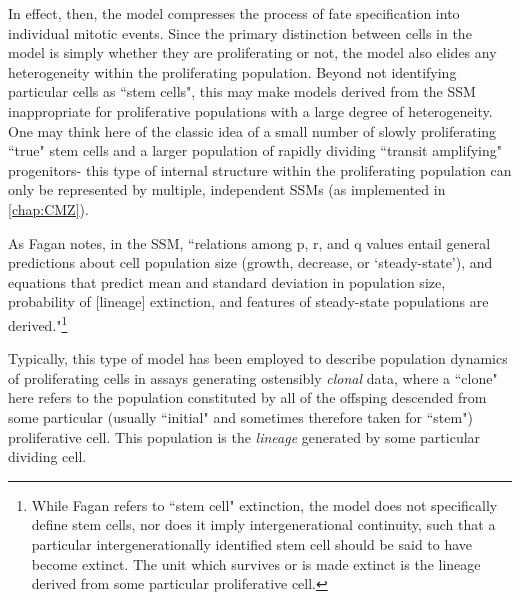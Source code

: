 In effect, then, the model compresses the process of fate specification into individual mitotic events. Since the primary distinction between cells in the model is simply whether they are proliferating or not, the model also elides any heterogeneity within the proliferating population. Beyond not identifying particular cells as ``stem cells", this may make models derived from the SSM inappropriate for proliferative populations with a large degree of heterogeneity. One may think here of the classic idea of a small number of slowly proliferating ``true" stem cells and a larger population of rapidly dividing ``transit amplifying" progenitors- this type of internal structure within the proliferating population can only be represented by multiple, independent SSMs (as implemented in \autoref{chap:CMZ}).

As Fagan notes, in the SSM, ``relations among p, r, and q values entail general predictions about cell population size (growth, decrease, or ‘steady-state’), and equations that predict mean and standard deviation in population size, probability of [lineage] extinction, and features of steady-state populations are derived."\footnote{While Fagan refers to ``stem cell" extinction, the model does not specifically define stem cells, nor does it imply intergenerational continuity, such that a particular intergenerationally identified stem cell should be said to have become extinct. The unit which survives or is made extinct is the lineage derived from some particular proliferative cell.}\cite[p.60]{Fagan2013}

Typically, this type of model has been employed to describe population dynamics of proliferating cells in assays generating ostensibly \textit{clonal} data, where a ``clone" here refers to the population constituted by all of the offsping descended from some particular (usually ``initial" and sometimes therefore taken for ``stem") proliferative cell. This population is the \textit{lineage} generated by some particular dividing cell.

